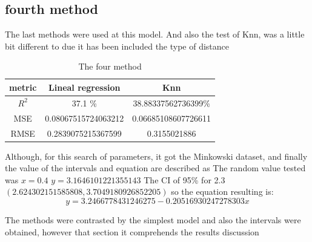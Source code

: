 \documentclass{article}
\begin{document}
\subsection{fourth method}
The last methods were used at this model. And also the test of Knn, was a little bit different to due it has been included the type of distance
\begin{table}[H]
\begin{center}
  \begin{tabular}{|c|c|c|}
    \hline
     metric & Lineal regression & Knn \\ \hline
     $R^2$& 37.1 \%&38.88337562736399\%\\
     MSE& 0.08067515724063212&0.06685108607726611\\
     RMSE&0.2839075215367599&0.3155021886\\
     \hline
    
  \end{tabular}
\end{center}
\caption{The four method}
\end{table}
Although, for this search of parameters, it got the Minkowski dataset, and finally the value of the intervals and equation are described as 
The random value tested was $x=0.4$ $ y=3.1646101221355143$
The CI of  95\% for 2.3 $(2.624302151585808, 3.7049180926852205)$
so the equation resulting is: $$y=3.2466778431246275 -0.20516930247278303x $$

The methods were contrasted by the simplest model and also the intervals were obtained, however that section it comprehends the results discussion
\end{document}

